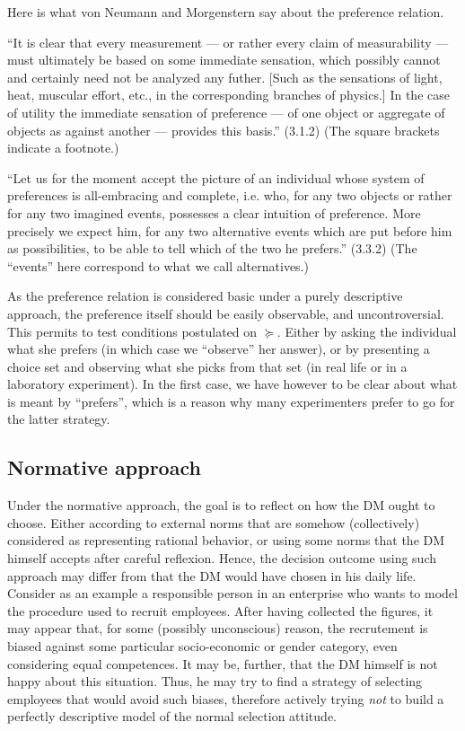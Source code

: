 \documentclass[french, english]{llncs}
\begin{document}
Here is what von Neumann and Morgenstern say about the preference relation.

“It is clear that every measurement --- or rather every claim of measurability --- must ultimately be based on some immediate sensation, which possibly cannot and certainly need not be analyzed any futher.
[Such as the sensations of light, heat, muscular effort, etc., in the corresponding branches of physics.] 
In the case of utility the immediate sensation of preference --- of one object or aggregate of objects as against another --- provides this basis.” (3.1.2) (The square brackets indicate a footnote.)

“Let us for the moment accept the picture of an individual whose system of preferences is all-embracing and complete, i.e. who, for any two objects or rather for any two imagined events, possesses a clear intuition of preference. More precisely we expect him, for any two alternative events which are put before him as possibilities, to be able to tell which of the two he prefers.” (3.3.2) (The “events” here correspond to what we call alternatives.)

As the preference relation is considered basic under a purely descriptive approach, the preference itself should be easily observable, and uncontroversial. This permits to test conditions postulated on $\succeq$. Either by asking the individual what she prefers (in which case we “observe” her answer), or by presenting a choice set and observing what she picks from that set (in real life or in a laboratory experiment). In the first case, we have however to be clear about what is meant by “prefers”, which is a reason why many experimenters prefer to go for the latter strategy.

\subsection{Normative approach}
Under the normative approach, the goal is to reflect on how the \ac{DM} ought to choose. Either according to external norms that are somehow (collectively) considered as representing rational behavior, or using some norms that the \ac{DM} himself accepts after careful reflexion. Hence, the decision outcome using such approach may differ from that the \ac{DM} would have chosen in his daily life. Consider as an example a responsible person in an enterprise who wants to model the procedure used to recruit employees. After having collected the figures, it may appear that, for some (possibly unconscious) reason, the recrutement is biased against some particular socio-economic or gender category, even considering equal competences. It may be, further, that the \ac{DM} himself is not happy about this situation. Thus, he may try to find a strategy of selecting employees that would avoid such biases, therefore actively trying \emph{not} to build a perfectly descriptive model of the normal selection attitude.
\end{document}
